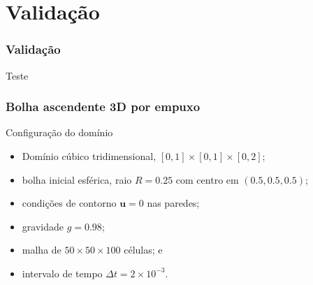 \documentclass[../main/main.tex]{subfiles}
\begin{document}
\section{Validação}


\begin{frame}
    \frametitle{Validação}
\end{frame}

\begin{frame}
    Teste
\end{frame}



\begin{frame}
    \frametitle{Bolha ascendente 3D por empuxo}
\end{frame}

\begin{frame}{Configuração do domínio}
    \begin{itemize}
        \item Domínio cúbico tridimensional, $[0,1]\times[0,1]\times[0,2]$;
        \item bolha inicial esférica, raio $R = 0.25$ com centro em $(0.5,0.5,0.5)$;
        \item condições de contorno $\mathbf{u} = 0$ nas paredes;
        \item gravidade $g = 0.98$;
        \item malha de $50\times50\times100$ células; e
        \item intervalo de tempo $\Delta t = 2\times 10^{-3}$.
    \end{itemize}
\end{frame}
\end{document}
